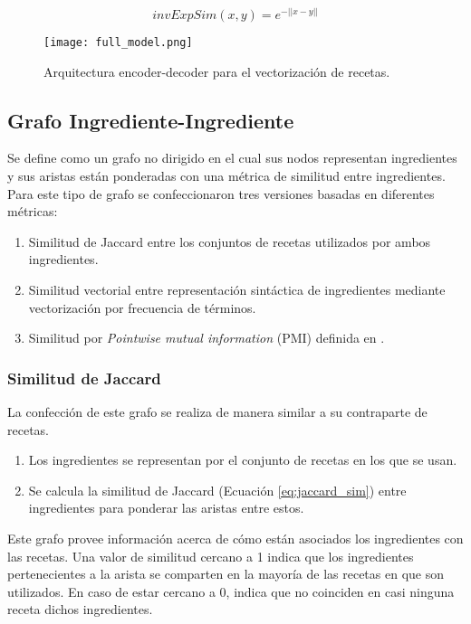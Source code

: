 \documentclass[
	a4paper, %
	10pt, %
	unnumberedsections, %
	twoside, %
]{LTJournalArticle}
\begin{document}
\begin{equation}
	invExpSim(x, y) = e^{-||x-y||}
	\label{eq:inverse_exp_sim}
\end{equation}

\begin{figure}
	\texttt{[image: full\_model.png]}
	\caption{Arquitectura encoder-decoder para el vectorización de recetas.}
	\label{fig:encoder_decoder_small}
\end{figure}

\subsection{Grafo Ingrediente-Ingrediente}

Se define como un grafo no dirigido en el cual sus nodos representan ingredientes y sus aristas
están ponderadas con una métrica de similitud entre ingredientes. 
Para este tipo de grafo se confeccionaron tres versiones basadas en diferentes métricas:

\begin{enumerate}
	\item Similitud de Jaccard entre los conjuntos de recetas utilizados por ambos ingredientes.
	\item Similitud vectorial entre representación sintáctica de ingredientes mediante vectorización 
	por frecuencia de términos.
	\item Similitud por \textit{Pointwise mutual information} (PMI) definida en \textcite{teng2012recipe}.
\end{enumerate}

\subsubsection{Similitud de Jaccard}

La confección de este grafo se realiza de manera similar a su contraparte de recetas.

\begin{enumerate}
	\item Los ingredientes se representan por el conjunto de recetas en los que se usan.
	\item Se calcula la similitud de Jaccard (Ecuación \ref{eq:jaccard_sim}) entre ingredientes para ponderar las aristas
	entre estos.
\end{enumerate}

Este grafo provee información acerca de cómo están asociados los ingredientes con las recetas. Una valor de similitud
cercano a 1 indica que los ingredientes pertenecientes a la arista se comparten en la mayoría de las recetas en que son
utilizados. En caso de estar cercano a 0, indica que no coinciden en casi ninguna receta dichos ingredientes.
\end{document}
